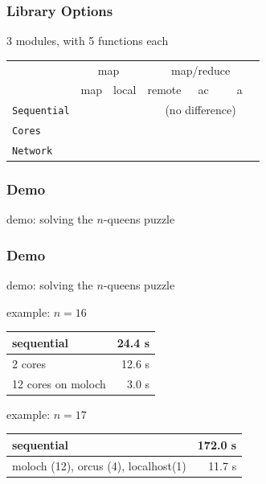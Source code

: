 \documentclass{beamer}
\let\emph\alert
\begin{document}
\begin{frame}\frametitle{Library Options}
  
  3 modules, with 5 functions each

  \begin{center}
    \begin{tabular}{|l|c|c|c|c|c|}
      \hline
                 & \multicolumn{2}{|c|}{map} &
                 \multicolumn{3}{|c|}{map/reduce} \\\cline{2-6}
                 & map & local & remote & ~ac~ & ~~a~~ \\\hline\hline
      \texttt{Sequential} & & & \multicolumn{3}{|c|}{(no difference)} \\\hline
      \texttt{Cores}      & & & & & \\\hline
      \texttt{Network}    & & & & & \\\hline
    \end{tabular}
  \end{center}
\end{frame}

\begin{frame}\frametitle{Demo}
  \emph{demo}: solving the $n$-queens puzzle
\end{frame}

\begin{frame}\frametitle{Demo}
  \emph{demo}: solving the $n$-queens puzzle



  example: $n=16$
  \begin{center}
    \begin{tabular}{|l|r|}
      \hline
      sequential & 24.4 s \\\hline
      2 cores    & 12.6 s \\\hline
      12 cores on moloch & 3.0 s \\\hline
    \end{tabular}
  \end{center}

  example: $n=17$
  \begin{center}
    \begin{tabular}{|l|r|}
       \hline
      sequential & 172.0 s \\\hline
      moloch (12), orcus (4), localhost(1) & 11.7 s \\\hline
    \end{tabular}
  \end{center}
\end{frame}
\end{document}
